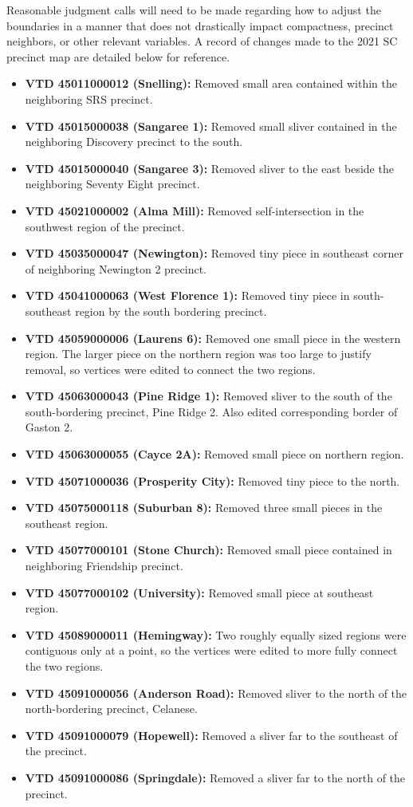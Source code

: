 \documentclass[11pt]{article}
\begin{document}
Reasonable judgment calls will need to be made regarding how to adjust the boundaries in a manner that does not drastically impact compactness, precinct neighbors, or other relevant variables. A record of changes made to the 2021 SC precinct map are detailed below for reference.

\begin{itemize}
	\item \textbf{VTD 45011000012 (Snelling):} Removed small area contained within the neighboring SRS precinct.
	\item \textbf{VTD 45015000038 (Sangaree 1):} Removed small sliver contained in the neighboring Discovery precinct to the south.
	\item \textbf{VTD 45015000040 (Sangaree 3):} Removed sliver to the east beside the neighboring Seventy Eight precinct.
	\item \textbf{VTD 45021000002 (Alma Mill):} Removed self-intersection in the southwest region of the precinct.
	\item \textbf{VTD 45035000047 (Newington):} Removed tiny piece in southeast corner of neighboring Newington 2 precinct.
	\item \textbf{VTD 45041000063 (West Florence 1):} Removed tiny piece in south-southeast region by the south bordering precinct.
	\item \textbf{VTD 45059000006 (Laurens 6):} Removed one small piece in the western region. The larger piece on the northern region was too large to justify removal, so vertices were edited to connect the two regions.
	\item \textbf{VTD 45063000043 (Pine Ridge 1):} Removed sliver to the south of the south-bordering precinct, Pine Ridge 2. Also edited corresponding border of Gaston 2.
	\item \textbf{VTD 45063000055 (Cayce 2A):} Removed small piece on northern region.
	\item \textbf{VTD 45071000036 (Prosperity City):} Removed tiny piece to the north.
	\item \textbf{VTD 45075000118 (Suburban 8):} Removed three small pieces in the southeast region.
	\item \textbf{VTD 45077000101 (Stone Church):} Removed small piece contained in neighboring Friendship precinct.
	\item \textbf{VTD 45077000102 (University):} Removed small piece at southeast region.
	\item \textbf{VTD 45089000011 (Hemingway):} Two roughly equally sized regions were contiguous only at a point, so the vertices were edited to more fully connect the two regions.
	\item \textbf{VTD 45091000056 (Anderson Road):} Removed sliver to the north of the north-bordering precinct, Celanese.
	\item \textbf{VTD 45091000079 (Hopewell):} Removed a sliver far to the southeast of the precinct.
	\item \textbf{VTD 45091000086 (Springdale):} Removed a sliver far to the north of the precinct.
\end{itemize}
\end{document}
